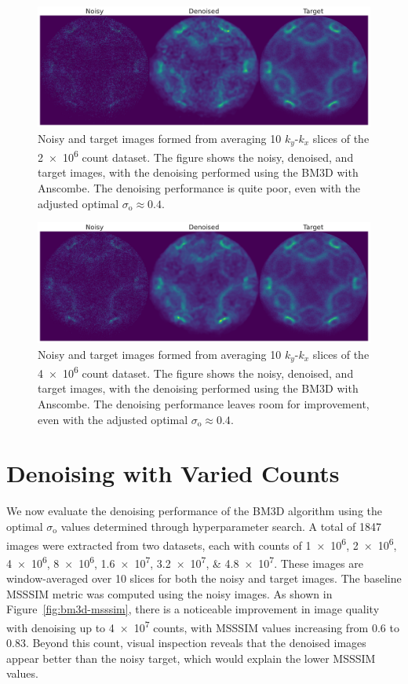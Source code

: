 \begin{figure}[h]
    \centering
    \includegraphics[width=1\linewidth]{images/noisy_denoised_ref_2M_avg_bm3d.pdf}
    \caption{Noisy and target images formed from averaging 10 $k_y$-$k_x$ slices of the \num{2e6} count dataset. The figure shows the noisy, denoised, and target images, with the denoising performed using the \gls{BM3D} with Anscombe. The denoising performance is quite poor, even with the adjusted optimal $\sigma_{\text{o}}\approx0.4$.}
    \label{fig:noisy-denoised-ref-2M-avg-bm3d}
\end{figure}


\begin{figure}[h]
    \centering
    \includegraphics[width=1\linewidth]{images/noisy_denoised_ref_4M_avg_bm3d.pdf}
    \caption{Noisy and target images formed from averaging 10 $k_y$-$k_x$ slices of the \num{4e6} count dataset. The figure shows the noisy, denoised, and target images, with the denoising performed using the \gls{BM3D} with Anscombe. The denoising performance leaves room for improvement, even with the adjusted optimal $\sigma_{\text{o}}\approx0.4$.}
    \label{fig:noisy-denoised-ref-4M-avg-bm3d}
\end{figure}

\section{Denoising with Varied Counts}
We now evaluate the denoising performance of the \gls{BM3D} algorithm using the optimal $\sigma_{\text{o}}$ values determined through hyperparameter search. A total of \num{1847} images were extracted from two datasets, each with counts of \numlist{1e6;2e6;4e6;8e6;1.6e7;3.2e7;4.8e7}. These images are window-averaged over 10 slices for both the noisy and target images. The baseline \gls{MSSSIM} metric was computed using the noisy images. As shown in Figure~\ref{fig:bm3d-msssim}, there is a noticeable improvement in image quality with denoising up to \num{4e7} counts, with \gls{MSSSIM} values increasing from \num{0.6} to \num{0.83}. Beyond this count, visual inspection reveals that the denoised images appear better than the noisy target, which would explain the lower \gls{MSSSIM} values.

